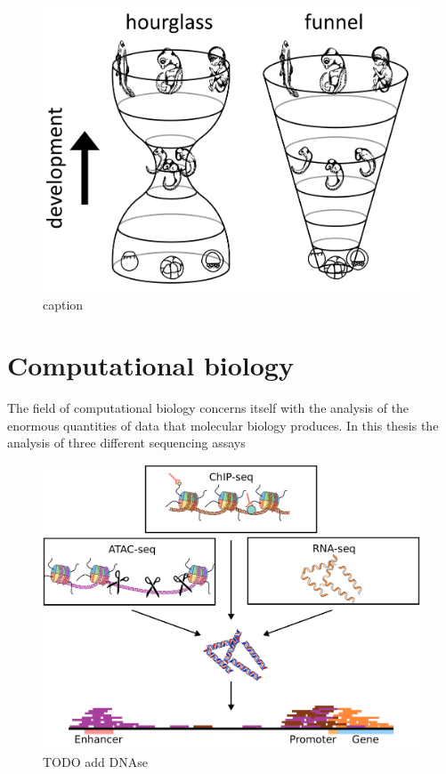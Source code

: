 \begin{figure}[H]
    \includegraphics[width=\linewidth]{ch.introduction/imgs/hourglass.png}
    \caption{caption}
    \label{fig:hourglass}
\end{figure}

\section{Computational biology}

The field of computational biology concerns itself with the analysis of the enormous quantities of data that molecular biology produces. In this thesis the analysis of three different sequencing assays 

\begin{figure}[H]
    \includegraphics[width=\linewidth]{ch.introduction/imgs/analysis.png}
    \caption{TODO add DNAse}
    \label{fig:analysis}
\end{figure}

